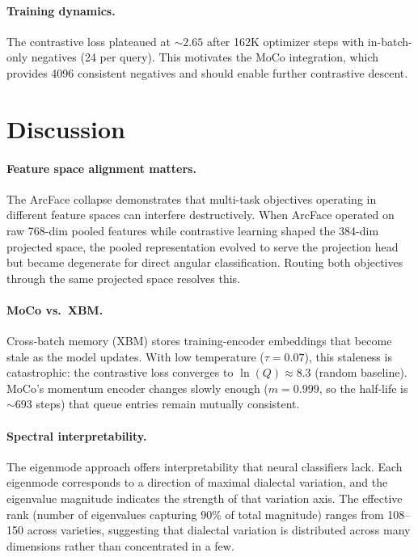 \documentclass[11pt,a4paper]{article}
\begin{document}
\paragraph{Training dynamics.}
The contrastive loss plateaued at $\sim 2.65$ after 162K optimizer steps
with in-batch-only negatives (24 per query). This motivates the MoCo
integration, which provides 4096 consistent negatives and should enable
further contrastive descent.

\section{Discussion}

\paragraph{Feature space alignment matters.}
The ArcFace collapse demonstrates that multi-task objectives operating in
different feature spaces can interfere destructively. When ArcFace operated
on raw 768-dim pooled features while contrastive learning shaped the 384-dim
projected space, the pooled representation evolved to serve the projection
head but became degenerate for direct angular classification. Routing both
objectives through the same projected space resolves this.

\paragraph{MoCo vs.\ XBM.}
Cross-batch memory (XBM) stores training-encoder embeddings that become stale
as the model updates. With low temperature ($\tau = 0.07$), this staleness
is catastrophic: the contrastive loss converges to $\ln(Q) \approx 8.3$
(random baseline). MoCo's momentum encoder changes slowly enough
($m = 0.999$, so the half-life is $\sim 693$ steps) that queue entries
remain mutually consistent.

\paragraph{Spectral interpretability.}
The eigenmode approach offers interpretability that neural classifiers lack.
Each eigenmode corresponds to a direction of maximal dialectal variation,
and the eigenvalue magnitude indicates the strength of that variation axis.
The effective rank (number of eigenvalues capturing 90\% of total magnitude)
ranges from 108--150 across varieties, suggesting that dialectal variation
is distributed across many dimensions rather than concentrated in a few.
\end{document}
